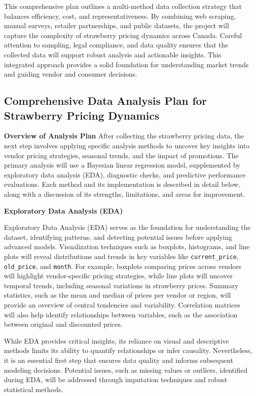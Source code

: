 \documentclass[
  letterpaper,
  DIV=11,
  numbers=noendperiod]{scrartcl}
\begin{document}
This comprehensive plan outlines a multi-method data collection strategy
that balances efficiency, cost, and representativeness. By combining web
scraping, manual surveys, retailer partnerships, and public datasets,
the project will capture the complexity of strawberry pricing dynamics
across Canada. Careful attention to sampling, legal compliance, and data
quality ensures that the collected data will support robust analysis and
actionable insights. This integrated approach provides a solid
foundation for understanding market trends and guiding vendor and
consumer decisions.

\subsection{Comprehensive Data Analysis Plan for Strawberry Pricing
Dynamics}\label{comprehensive-data-analysis-plan-for-strawberry-pricing-dynamics}

\textbf{Overview of Analysis Plan} After collecting the strawberry
pricing data, the next step involves applying specific analysis methods
to uncover key insights into vendor pricing strategies, seasonal trends,
and the impact of promotions. The primary analysis will use a Bayesian
linear regression model, supplemented by exploratory data analysis
(EDA), diagnostic checks, and predictive performance evaluations. Each
method and its implementation is described in detail below, along with a
discussion of its strengths, limitations, and areas for improvement.

\textbf{Exploratory Data Analysis (EDA)}

Exploratory Data Analysis (EDA) serves as the foundation for
understanding the dataset, identifying patterns, and detecting potential
issues before applying advanced models. Visualization techniques such as
boxplots, histograms, and line plots will reveal distributions and
trends in key variables like \texttt{current\_price},
\texttt{old\_price}, and \texttt{month}. For example, boxplots comparing
prices across vendors will highlight vendor-specific pricing strategies,
while line plots will uncover temporal trends, including seasonal
variations in strawberry prices. Summary statistics, such as the mean
and median of prices per vendor or region, will provide an overview of
central tendencies and variability. Correlation matrices will also help
identify relationships between variables, such as the association
between original and discounted prices.

While EDA provides critical insights, its reliance on visual and
descriptive methods limits its ability to quantify relationships or
infer causality. Nevertheless, it is an essential first step that
ensures data quality and informs subsequent modeling decisions.
Potential issues, such as missing values or outliers, identified during
EDA, will be addressed through imputation techniques and robust
statistical methods.
\end{document}
